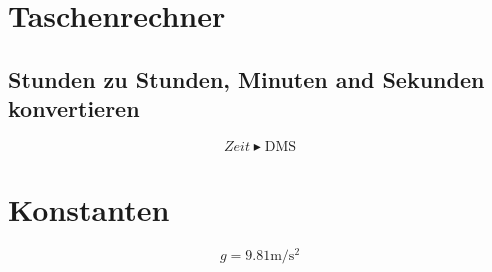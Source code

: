 \documentclass[a4paper]{article}
\begin{document}
  \section{Taschenrechner}
  \subsection{Stunden zu Stunden, Minuten and Sekunden konvertieren}
  \begin{equation}
    Zeit \blacktriangleright \mbox{DMS}
  \end{equation}

  \section{Konstanten}
  \begin{equation}
    g = 9.81 \si{\metre\per\square\second}
  \end{equation}
\end{document}
